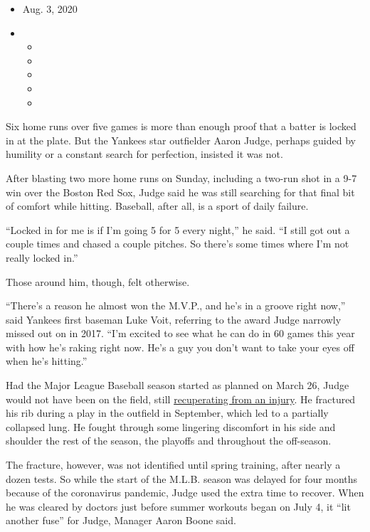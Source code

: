 \begin{itemize}
\item
  Aug. 3, 2020
\item
  \begin{itemize}
  \item
  \item
  \item
  \item
  \item
  \end{itemize}
\end{itemize}

Six home runs over five games is more than enough proof that a batter is
locked in at the plate. But the Yankees star outfielder Aaron Judge,
perhaps guided by humility or a constant search for perfection, insisted
it was not.

After blasting two more home runs on Sunday, including a two-run shot in
a 9-7 win over the Boston Red Sox, Judge said he was still searching for
that final bit of comfort while hitting. Baseball, after all, is a sport
of daily failure.

``Locked in for me is if I'm going 5 for 5 every night,'' he said. ``I
still got out a couple times and chased a couple pitches. So there's
some times where I'm not really locked in.''

Those around him, though, felt otherwise.

``There's a reason he almost won the M.V.P., and he's in a groove right
now,'' said Yankees first baseman Luke Voit, referring to the award
Judge narrowly missed out on in 2017. ``I'm excited to see what he can
do in 60 games this year with how he's raking right now. He's a guy you
don't want to take your eyes off when he's hitting.''

Had the Major League Baseball season started as planned on March 26,
Judge would not have been on the field, still
\href{https://www.nytimes.com/2020/03/06/sports/baseball/aaron-judge-yankees.html}{recuperating
from an injury}. He fractured his rib during a play in the outfield in
September, which led to a partially collapsed lung. He fought through
some lingering discomfort in his side and shoulder the rest of the
season, the playoffs and throughout the off-season.

The fracture, however, was not identified until spring training, after
nearly a dozen tests. So while the start of the M.L.B. season was
delayed for four months because of the coronavirus pandemic, Judge used
the extra time to recover. When he was cleared by doctors just before
summer workouts began on July 4, it ``lit another fuse'' for Judge,
Manager Aaron Boone said.

